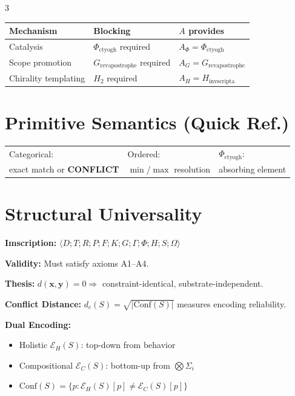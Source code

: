 \documentclass[8pt,a4paper,landscape]{article}
\newcommand{\cat}[1]{\textcolor{catblue}{#1}}
\newcommand{\ord}[1]{\textcolor{ordgreen}{#1}}
\newcommand{\spec}[1]{\textcolor{specpurple}{#1}}
\newcommand{\conf}{\textcolor{confred}{\textbf{CONFLICT}}}
\begin{document}
\begin{multicols}{3}
\begin{center}
\footnotesize
\renewcommand{\arraystretch}{1.1}
\begin{tabular}{|l|l|l|}
\hline
\textbf{Mechanism} & \textbf{Blocking} & \textbf{$A$ provides} \\
\hline
Catalysis & $\Phi_{\text{ctyogh}}$ required & $A_\Phi = \Phi_{\text{ctyogh}}$ \\
Scope promotion & $G_{\text{revapostrophe}}$ required & $A_G = G_{\text{revapostrophe}}$ \\
Chirality templating & $H_2$ required & $A_H = H_{\text{invscripta}}$ \\
\hline
\end{tabular}
\end{center}

\section*{Primitive Semantics (Quick Ref.)}
\footnotesize
\begin{tabular}{@{}p{2.6cm}p{2.6cm}p{2.6cm}@{}}
\cat{Categorical:} & \ord{Ordered:} & \spec{$\Phi_{\text{ctyogh}}$:} \\
exact match or \conf & $\min$/$\max$ resolution & absorbing element \\
\end{tabular}

\section*{Structural Universality}
\footnotesize
\textbf{Imscription:} $\langle D;T;R;P;F;K;G;\Gamma;\Phi;H;S;\Omega\rangle$

\textbf{Validity:} Must satisfy axioms A1–A4.

\textbf{Thesis:} $d(\mathbf{x},\mathbf{y})=0 \Rightarrow$ constraint-identical, substrate-independent.

\textbf{Conflict Distance:} $d_c(S)=\sqrt{|\text{Conf}(S)|}$ measures encoding reliability.

\textbf{Dual Encoding:}
\begin{itemize}[leftmargin=*,nosep,topsep=4pt,itemsep=2pt]
\item Holistic $\mathcal{E}_H(S)$: top-down from behavior
\item Compositional $\mathcal{E}_C(S)$: bottom-up from $\bigotimes Σ_i$
\item $\text{Conf}(S) = \{p : \mathcal{E}_H(S)[p] \neq \mathcal{E}_C(S)[p]\}$
\end{itemize}


\end{multicols}
\end{document}
